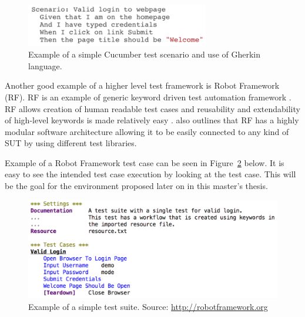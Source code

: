 \begin{figure}[ht]
  \begin{center}
    \includegraphics[width=8cm]{images/cucumber_example.png}
    \caption{Example of a simple Cucumber test scenario and use of Gherkin language.}
    \label{fig:cucumber}
  \end{center}
\end{figure}
\FloatBarrier

Another good example of a higher level test framework is Robot Framework (RF). RF is an example of generic keyword driven test automation framework \emph{\citep{robotframework}}. RF allows creation of human readable test cases and reusability and extendability of high-level keywords is made relatively easy \emph{\citep{stresnjak2011usage}}. \emph{\cite{Rfuserguide}} also outlines that RF has a highly modular software architecture allowing it to be easily connected to any kind of SUT by using different test libraries.

Example of a Robot Framework test case can be seen in Figure~\ref{fig:robot_example} below. It is easy to see the intended test case execution by looking at the test case. This will be the goal for the environment proposed later on in this master's thesis.

\begin{figure}[ht]
  \begin{center}
    \includegraphics[width=12cm]{images/robot_example.png}
    \caption{Example of a simple test suite. Source: \url{http://robotframework.org}}
    \label{fig:robot_example}
  \end{center}
\end{figure}
\FloatBarrier
